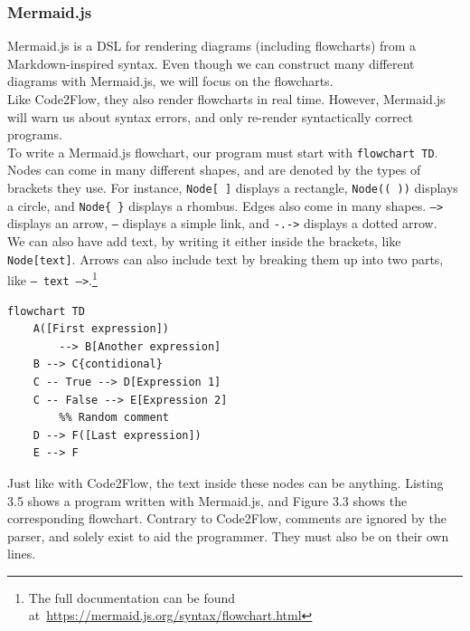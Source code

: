 \subsubsection{Mermaid.js}

Mermaid.js is a DSL for rendering diagrams (including flowcharts) from a Markdown-inspired syntax. Even though we can construct many different diagrams with Mermaid.js, we will focus on the flowcharts. \\

Like Code2Flow, they also render flowcharts in real time. However, Mermaid.js will warn us about syntax errors, and only re-render syntactically correct programs. \\

To write a Mermaid.js flowchart, our program must start with \texttt{flowchart TD}. Nodes can come in many different shapes, and are denoted by the types of brackets they use. For instance, \texttt{Node[ ]} displays a rectangle, \texttt{Node(( ))} displays a circle, and \texttt{Node\{ \}} displays a rhombus. Edges also come in many shapes. \texttt{-->} displays an arrow, \texttt{---} displays a simple link, and \texttt{-.->} displays a dotted arrow. \hfill \\

We can also have add text, by writing it either inside the brackets, like \texttt{Node[text]}. Arrows can also include text by breaking them up into two parts, like \texttt{-- text -->}.\footnote{The full documentation can be found at~\url{https://mermaid.js.org/syntax/flowchart.html}} \\

\begin{lstlisting}[caption={A mermaid.js program}, captionpos=b]
flowchart TD
    A([First expression])
        --> B[Another expression]
    B --> C{contidional}
    C -- True --> D[Expression 1]
    C -- False --> E[Expression 2]
        %% Random comment
    D --> F([Last expression])
    E --> F
\end{lstlisting}

Just like with Code2Flow, the text inside these nodes can be anything. Listing 3.5 shows a program written with Mermaid.js, and Figure 3.3 shows the corresponding flowchart. Contrary to Code2Flow, comments are ignored by the parser, and solely exist to aid the programmer. They must also be on their own lines. \\

